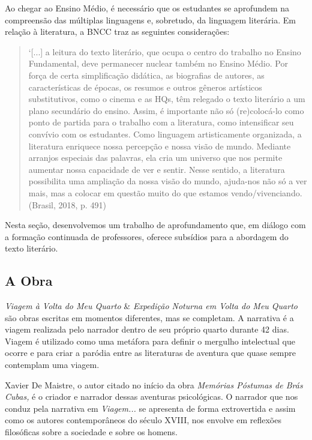 \documentclass[12pt]{extarticle}
\begin{document}
Ao chegar ao Ensino Médio, é necessário que os estudantes se aprofundem
na compreensão das múltiplas linguagens e, sobretudo, da linguagem
literária. Em relação à literatura, a BNCC traz as seguintes
considerações:

\begin{quote}
`{[}...{]} a leitura do texto literário, que ocupa o centro do trabalho
no Ensino Fundamental, deve permanecer nuclear também no Ensino Médio.
Por força de certa simplificação didática, as biografias de autores, as
características de épocas, os resumos e outros gêneros artísticos
substitutivos, como o cinema e as HQs, têm relegado o texto literário a
um plano secundário do ensino. Assim, é importante não só (re)colocá-lo
como ponto de partida para o trabalho com a literatura, como
intensificar seu convívio com os estudantes. Como linguagem
artisticamente organizada, a literatura enriquece nossa percepção e
nossa visão de mundo. Mediante arranjos especiais das palavras, ela cria
um universo que nos permite aumentar nossa capacidade de ver e sentir.
Nesse sentido, a literatura possibilita uma ampliação da nossa visão do
mundo, ajuda-nos não só a ver mais, mas a colocar em questão muito do
que estamos vendo/vivenciando. (Brasil, 2018, p. 491)
\end{quote}

Nesta seção, desenvolvemos um trabalho de aprofundamento que, em diálogo
com a formação continuada de professores, oferece subsídios para a
abordagem do texto literário.

\subsection{A Obra}




\emph{Viagem à Volta do Meu Quarto} \& \emph{Expedição Noturna em Volta
do Meu Quarto} são obras escritas em momentos diferentes, mas se
completam. A narrativa é a viagem realizada pelo narrador dentro de seu
próprio quarto durante 42 dias. Viagem é utilizado como uma metáfora
para definir o mergulho intelectual que ocorre e para criar a paródia
entre as literaturas de aventura que quase sempre contemplam uma viagem.

Xavier De Maistre, o autor citado no início da obra \emph{Memórias
Póstumas de Brás Cubas,} é o criador e narrador dessas aventuras
psicológicas. O narrador que nos conduz pela narrativa em
\emph{Viagem...} se apresenta de forma extrovertida e assim como os
autores contemporâneos do século XVIII, nos envolve em reflexões
filosóficas sobre a sociedade e sobre os homens.
\end{document}
